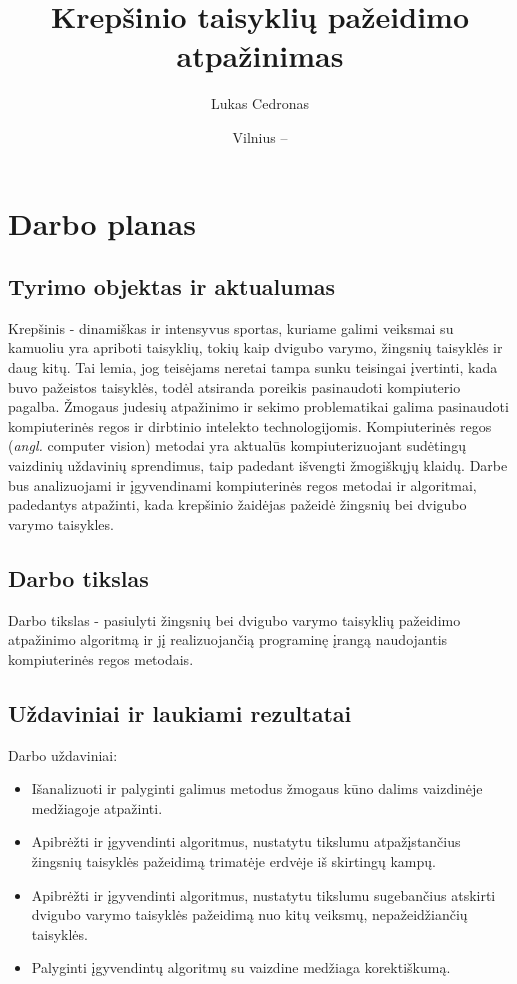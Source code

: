 \documentclass{VUMIFPSbakalaurinis}
\institute{Informatikos institutas}  %
\title{Krepšinio taisyklių pažeidimo atpažinimas}
\author{Lukas Cedronas}
\date{Vilnius – \the\year}
\begin{document}
\maketitle


\section{Darbo planas}

\subsection{Tyrimo objektas ir aktualumas}
Krepšinis - dinamiškas ir intensyvus sportas, kuriame galimi veiksmai su kamuoliu yra apriboti taisyklių, tokių kaip dvigubo varymo, žingsnių taisyklės ir daug kitų. Tai lemia, jog teisėjams neretai tampa sunku teisingai įvertinti, kada buvo pažeistos taisyklės, todėl atsiranda poreikis pasinaudoti kompiuterio pagalba. Žmogaus judesių atpažinimo ir sekimo problematikai galima pasinaudoti kompiuterinės regos ir dirbtinio intelekto technologijomis. Kompiuterinės regos (\textit{angl.} computer vision) metodai yra aktualūs kompiuterizuojant sudėtingų vaizdinių uždavinių sprendimus, taip padedant išvengti žmogiškųjų klaidų. Darbe bus analizuojami ir įgyvendinami kompiuterinės regos metodai ir algoritmai, padedantys atpažinti, kada krepšinio žaidėjas pažeidė žingsnių bei dvigubo varymo taisykles. 

\subsection{Darbo tikslas}
Darbo tikslas - pasiulyti žingsnių bei dvigubo varymo taisyklių pažeidimo atpažinimo algoritmą ir jį realizuojančią programinę įrangą naudojantis kompiuterinės regos metodais.

\subsection{Uždaviniai ir laukiami rezultatai}
Darbo uždaviniai:
\begin{itemize}[topsep=5pt,itemsep=-1ex,partopsep=2ex,parsep=2ex]
 \item Išanalizuoti ir palyginti galimus metodus žmogaus kūno dalims vaizdinėje medžiagoje atpažinti.
 \item Apibrėžti ir įgyvendinti algoritmus, nustatytu tikslumu atpažįstančius žingsnių taisyklės pažeidimą trimatėje erdvėje iš skirtingų kampų.
 \item Apibrėžti ir įgyvendinti algoritmus, nustatytu tikslumu sugebančius atskirti dvigubo varymo taisyklės pažeidimą nuo kitų veiksmų, nepažeidžiančių taisyklės.
 \item Palyginti įgyvendintų algoritmų su vaizdine medžiaga korektiškumą. 
\end{itemize}
\end{document}
